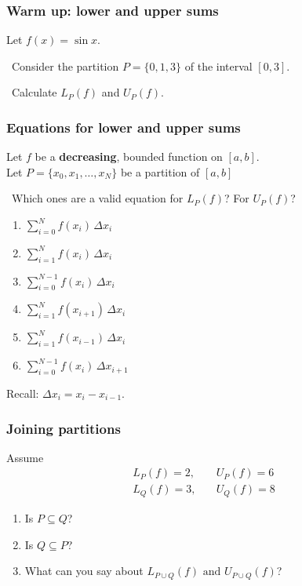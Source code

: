 \documentclass[14pt]{beamer}
\newcommand{\setsize}[1]{\fontsize{#1}{#1}\selectfont} %
\newcommand{\smallerfont}{\setsize{13}} %
\begin{document}
	\begin{frame}[t]
		\frametitle{Warm up: lower and upper sums}

		Let ${\displaystyle f(x) = \sin x}$.

		\
 Consider the partition ${\displaystyle P= \{0, 1, 3\}}$ of the interval
		${\displaystyle [0,3]}$.

		\
 Calculate ${\displaystyle L_P(f)}$ and ${\displaystyle U_P(f)}$.
	\end{frame}

	\begin{frame}[t]
		\smallerfont
		\frametitle{Equations for lower and upper sums}

		Let $f$ be a {\bf decreasing}, bounded function on $[a,b]$. \\ Let
		${\displaystyle P = \{x_0, x_1, \ldots, x_N\}}$ be a partition of $[a,b]$

		\
 Which ones are a valid equation for $L_{P}(f)$? For $U_{P}(f)$?

		\begin{multicols}{3}
			\begin{enumerate}
				\item ${\displaystyle \sum_{i=0}^N f(x_i) \, \Delta x_i}$

				\item ${\displaystyle \sum_{i = 1}^N f(x_i) \, \Delta x_i}$

				\item ${\displaystyle \sum_{i = 0}^{N-1} f(x_i) \, \Delta x_i}$

				\item ${\displaystyle \sum_{i = 1}^N f(x_{i+1}) \, \Delta x_i}$

				\item ${\displaystyle \sum_{i = 1}^N f(x_{i-1}) \, \Delta x_i}$

				\item ${\displaystyle \sum_{i = 0}^{N-1} f(x_{i}) \, \Delta x_{i+1}}$
			\end{enumerate}
		\end{multicols}

		Recall: ${\displaystyle \Delta x_i = x_i - x_{i-1}}$.
	\end{frame}
	\begin{frame}[t]
		\frametitle{Joining partitions}

		Assume
		\begin{align*}
			L_{P}(f)=2, & \quad U_{P}(f)=6 \\
			L_{Q}(f)=3, & \quad U_{Q}(f)=8
		\end{align*}

		\begin{enumerate}
			\item Is ${\displaystyle P \subseteq Q}$?

			\item Is ${\displaystyle Q \subseteq P}$?

			\item What can you say about ${\displaystyle L_{P \cup Q}(f) \mbox{ and } U_{P \cup Q}(f) }$?
		\end{enumerate}
	\end{frame}
\end{document}
